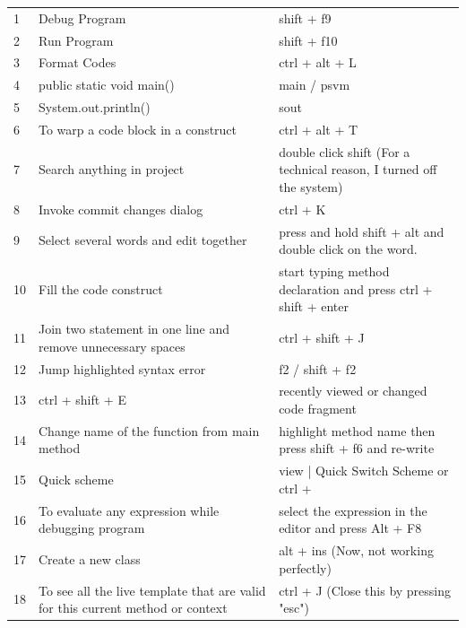 \documentclass[10 pt]{book}
\begin{document}
\begin{center}
	\begin{longtable}{|| m{1 em} || m{15 em} m{17 em} ||}
	\label{IntelliJ IDEA:1}\\
		\hline\hline
		\rowcolor{teal!20}
		\multicolumn{3}{c}{\textbf{\textsf{\textcolor{black}{IntelliJ IDEA Commands and Shortcuts}}}}\\
		\hline\hline
		1 & Debug Program & shift + f9\\
		\hline
		2 & Run Program & shift + f10\\
		\hline
		3 & Format Codes & ctrl + alt + L\\
		\hline
		4 & public static void main() & main / psvm\\
		\hline
		5 & System.out.println() & sout\\
		\hline
		6 & To warp a code block in a construct & ctrl + alt + T\\
		\hline
		7 & Search anything in project & double click shift (For a technical reason, I turned off the system)\\
		\hline
		8 & Invoke commit changes dialog & ctrl + K\\
		\hline
		9 & Select several words and edit together & press and hold shift + alt and double click on the word.\\
		\hline
		10 & Fill the code construct & start typing method declaration and press ctrl + shift + enter\\
		\hline
		11 & Join two statement in one line and remove unnecessary spaces & ctrl + shift + J\\
		\hline
		12 & Jump highlighted syntax error & f2 / shift + f2\\
		\hline
		13 & ctrl + shift + E & recently viewed or changed code fragment\\
		\hline
		14 & Change name of the function from main method & highlight method name then press shift + f6 and re-write\\
		\hline
		\rowcolor{red}
		15 & Quick scheme & view | Quick Switch Scheme or ctrl +  \\
		\hline
		16 & To evaluate any expression while debugging program & select the expression in the editor and press Alt + F8\\
		\hline
		17 & Create a new class & alt + ins (Now, not working perfectly)\\
		\hline
		18 & To see all the live template that are valid for this current method or context & ctrl + J (Close this by pressing "esc")\\

\end{longtable}
\end{center}
\end{document}
